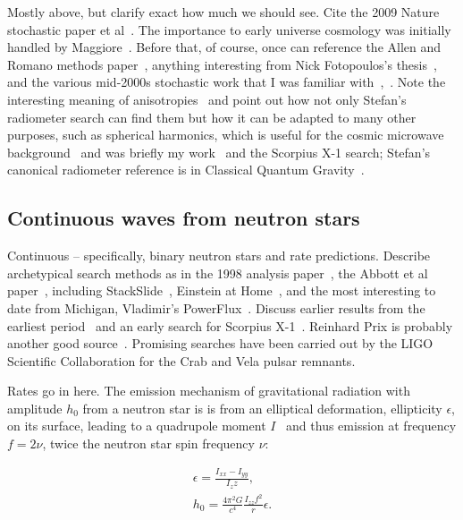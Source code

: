 		Mostly above, but clarify exact how much we should see. Cite the 2009 Nature stochastic paper et al~\cite{LIGOStochasticNature2009}. The importance to early universe cosmology was initially handled by Maggiore~\cite{Maggiore2000}. Before that, of course, once can reference the Allen and Romano methods paper~\cite{Allen1999}, anything interesting from Nick Fotopoulos's thesis~\cite{FotopoulosThesis}, and the various mid-2000s stochastic work that I was familiar with~\cite{Abbott2006},~\cite{Abbott2007}. Note the interesting meaning of anisotropies~\cite{Allen1997} and point out how not only Stefan's radiometer search can find them but how it can be adapted to many other purposes, such as spherical harmonics, which is useful for the cosmic microwave background~\cite{Muciaccia1997} and was briefly my work~\cite{MeadorsCaltech2007} and the Scorpius X-1 search; Stefan's canonical radiometer reference is in Classical Quantum Gravity~\cite{Radiometer2006}.

        \subsection{Continuous waves from neutron stars}
        \label{continuous_waves}

            Continuous -- specifically, binary neutron stars and rate predictions. Describe archetypical search methods as in the 1998 analysis paper~\cite{Jaranowski1998}, the Abbott et al paper~\cite{LSCPulsar2006}, including StackSlide~\cite{LSCPulsarS4}, Einstein at Home~\cite{LSCEinsteinHome2009}, and the most interesting to date from Michigan, Vladimir's PowerFlux~\cite{LSCPowerFlux2009}. Discuss earlier results from the earliest period~\cite{Abbott2004} and an early search for Scorpius X-1~\cite{AbbottPulsar2006}. Reinhard Prix is probably another good source~\cite{Prix2006}.
Promising searches have been carried out by the LIGO Scientific Collaboration for the Crab and Vela pulsar remnants.

		Rates go in here.
        The emission mechanism of gravitational radiation with amplitude $h_0$ from a neutron star is is from an elliptical deformation, ellipticity $\epsilon$, on its surface, leading to a quadrupole moment $I$~\cite{Zimmermann1979,LSCPulsar2006} and thus emission at frequency $f = 2\nu$, twice the neutron star spin frequency $\nu$:

        \begin{eqnarray}
        \epsilon = \frac{I_{xx} - I_{yy}}{I_zz}, \\
        h_0 = \frac{4 \pi^2 G}{c^4} \frac{I_{zz} f^2}{r} \epsilon.
        \end{eqnarray}

